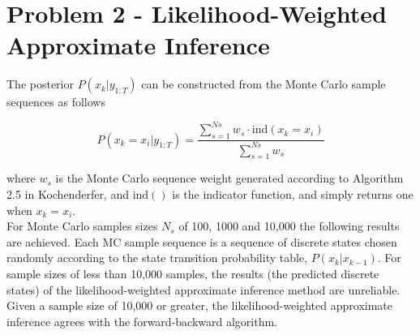 \documentclass[]{article}
\begin{document}
\section*{Problem 2 - Likelihood-Weighted Approximate Inference}

The posterior $P(x_k \vert y_{1:T})$ can be constructed from the Monte Carlo sample sequences as follows

\begin{equation}
	P(x_k = x_i \vert y_{1:T}) = \frac{\sum_{s=1}^{Ns} w_s \cdot \text{ind}(x_k = x_i)}{\sum_{s=1}^{Ns} w_s}
\end{equation}

where $w_s$ is the Monte Carlo sequence weight generated according to Algorithm 2.5 in Kochenderfer, and $\text{ind}()$ is the indicator function, and simply returns one when $x_k = x_i$.\\

For Monte Carlo samples sizes $N_s$ of 100, 1000 and 10,000 the following results are achieved. Each MC sample sequence is a sequence of discrete states chosen randomly according to the state transition probability table, $P(x_k \vert x_{k-1})$. For sample sizes of less than 10,000 samples, the results (the predicted discrete states) of the likelihood-weighted approximate inference method are unreliable. Given a sample size of 10,000 or greater, the likelihood-weighted approximate inference agrees with the forward-backward algorithm.
\end{document}
